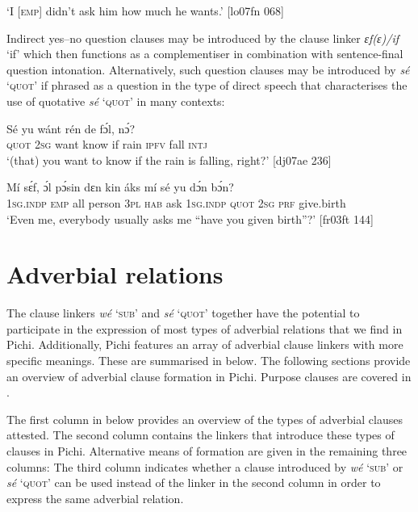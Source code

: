\glt ‘I [\textsc{emp}] didn’t ask him how much he wants.’ [lo07fn 068]
\z

Indirect yes–no question clauses may be introduced by the clause linker \textit{ɛf(ɛ)}\textit{\textup{/}}\textit{if} ‘if’ which then functions as a complementiser in combination with sentence-final question intonation. Alternatively, such question clauses may be introduced by \textit{sé} ‘\textsc{quot}’ if phrased as a question in the type of direct speech that characterises the use of quotative \textit{sé} ‘\textsc{quot}’ in many contexts:


\ea%
    \label{ex:key:1456}
    \gll Sé    yu  wánt        rén    de  fɔ́l,  nɔ́?\\
\textsc{quot}    \textsc{2sg}  want  know  if  rain    \textsc{ipfv}  fall  \textsc{intj}\\

\glt ‘(that) you want to know if the rain is falling, right?’ [dj07ae 236]
\z


\ea%
    \label{ex:key:1457}
    \gll Mí    sɛ́f,  ɔ́l  pɔ́sin  dɛn  kin  áks  mí    sé
yu  dɔ́n  bɔ́n?\\
\textsc{1sg.indp}  \textsc{emp}  all  person  \textsc{3pl}  \textsc{hab}  ask  \textsc{1sg.indp}  \textsc{quot}
\textsc{2sg}  \textsc{prf}  give.birth\\

\glt ‘Even me, everybody usually asks me “have you given 
birth”?’ [fr03ft 144]
\z

\section{Adverbial relations}\label{sec:10.7}

The clause linkers \textit{wé} ‘\textsc{sub}’ and \textit{sé} \textsc{‘quot’} together have the potential to participate in the expression of most types of adverbial relations that we find in Pichi. Additionally, Pichi features an array of adverbial clause linkers with more specific meanings. These are summarised in  below. The following sections provide an overview of adverbial clause formation in Pichi. Purpose clauses are covered in .


The first column in  below provides an overview of the types of adverbial clauses attested. The second column contains the linkers that introduce these types of clauses in Pichi. Alternative means of formation are given in the remaining three columns: The third column indicates whether a clause introduced by \textit{wé} ‘\textsc{sub}’ or \textit{sé} ‘\textsc{quot}’ can be used instead of the linker in the second column in order to express the same adverbial relation. 



